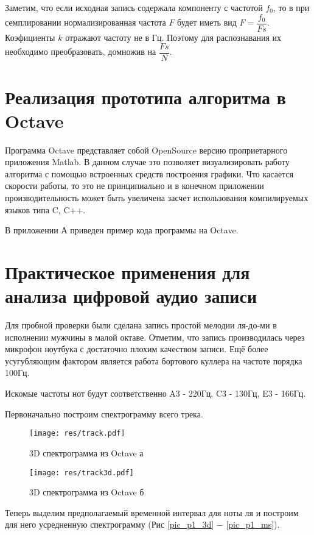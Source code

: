 \documentclass[oneside, final, 14pt]{extarticle}
\begin{document}
  Заметим, что если исходная запись содержала компоненту с частотой $f_0$, то
  в при семплировании нормализированная частота $F$ будет иметь вид $F=\dfrac{f_0}{Fs}$.
  Коэфициенты $k$ отражают частоту не в Гц. Поэтому для распознавания их необходимо преобразовать,
  домножив на $\dfrac{Fs}{N}$.

\cleardoublepage
\section{Реализация прототипа алгоритма в Octave}
  Программа Octave представляет собой OpenSource версию проприетарного приложения
  Matlab. В данном случае это позволяет визуализировать работу алгоритма с помощью
  встроенных средств построения графики. Что касается скорости работы, то это не
  принципиально и в конечном приложении производительность может быть увеличена
  засчет использования компилируемых языков типа C, C++.

  В приложении А приведен пример кода программы на Octave.

\cleardoublepage
\section{Практическое применения для анализа цифровой аудио записи}

  Для пробной проверки были сделана запись простой мелодии ля-до-ми в исполнении мужчины
  в малой октаве. Отметим, что запись производилась через микрофон ноутбука с
  достаточно плохим качеством записи. Ещё более усугубляющим фактором является
  работа бортового куллера на частоте порядка 100Гц.

  Искомые частоты нот будут соответственно A3 - 220Гц, C3 - 130Гц, E3 - 166Гц.

  Первоначально построим спектрограмму всего трека.
  \begin{figure}[h]
    \begin{multicols}{2}
      \hfill
      \texttt{[image: res/track.pdf]}
      \hfill
      \caption{3D спектрограмма из Octave а}
      \label{pic_3da}
      \hfill
      \texttt{[image: res/track3d.pdf]}
      \hfill
      \caption{3D спектрограмма из Octave б}
      \label{pic_3db}
    \end{multicols}
  \end{figure}

  Теперь выделим предполагаемый временной интервал для ноты ля и построим
  для него усредненную спектрограмму (Рис \ref{pic_p1_3d} $-$ \ref{pic_p1_ms}).
\end{document}
